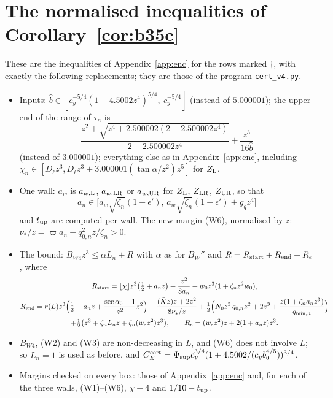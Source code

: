 \documentclass[11pt]{amsart}
\newcommand{\ta}{\tan\alpha}
\newcommand{\sez}{\sec\alpha_0}
\newcommand{\Kb}{\bar K}
\theoremstyle{definition}
\theoremstyle{remark}
\numberwithin{equation}{section}
\begin{document}
\section{The normalised inequalities of Corollary~\ref{cor:b35c}}\label{app:encC}
These are the inequalities of Appendix~\ref{app:enc} for the rows marked $\dagger$, with exactly the following
replacements; they are those of the program \texttt{cert\_v4.py}.
\begin{itemize}
\item Inputs: $\hat b\in[c_y^{-5/4}(1-4.5002z^4)^{5/4},\ c_y^{-5/4}]$ (instead of $5.000001$); the upper end of the range of
$\tau_n$ is
\[
\frac{z^2+\sqrt{z^4+2.500002(2-2.500002z^4)}}{2-2.500002z^4}+\frac{z^3}{16\hat b}
\]
(instead of $3.000001$); everything
else as in Appendix~\ref{app:enc}, including $\chi_n\in[D_\ell z^3,D_\ell z^3+3.000001(\ta/z^2)z^5]$ for $Z_{\rm L}$.
\item One wall: $a_w$ is $a_{w,\rm L}$, $a_{w,\rm LR}$ or $a_{w,\rm UR}$ for $Z_{\rm L}$, $Z_{\rm LR}$, $Z_{\rm UR}$, so that
\[
a_n\in\bigl[a_w\sqrt{\zeta_n}(1-\epsilon'),\,a_w\sqrt{\zeta_n}(1+\epsilon')+g_qz^4\bigr]
\]
and $t_{\rm up}$ are computed per wall. The new
margin (W6), normalised by $z$: $\nu_*/z=\varpi a_n-q_{0,n}^2z/\zeta_n>0$.
\item The bound: $B_{W4}z^3\le\alpha L_n+R$ with $\alpha$ as for $B_W''$ and $R=R_{\rm start}+R_{\rm end}+R_e$, where
\begin{gather*}
R_{\rm start}=\lfloor\chi\rfloor z^3\bigl(\tfrac12+a_nz\bigr)+\frac{z^2}{8a_n}+w_0z^3(1+\zeta_nz^2w_0),\\
R_{\rm end}=r(L)z^3\Bigl(\tfrac12+a_nz+\frac{\sez-1}{z^2}z^2\Bigr)+\frac{(\Kb z)z+2z^2}{8\nu_*/z}
+\tfrac12\Bigl(N_0z^3\,q_{0,n}z^2+2z^3+\frac{z(1+\zeta_na_nz^3)}{q_{\min,n}}\Bigr)\\
+\tfrac12\bigl(z^3+\zeta_nL_nz+\zeta_n(w_ez^2)z^3\bigr),\qquad
R_e=(w_ez^2)z+2(1+a_nz)z^3 .
\end{gather*}
\item $B_{W4}$, (W2) and (W3) are non-decreasing in $L$, and (W6) does not involve $L$; so $L_n=1$ is used as before, and
$C_E^{\rm cert}=\Psi_{\sup}c_y^{3/4}(1+4.5002/(c_yb_0^{4/5}))^{3/4}$.
\item Margins checked on every box: those of Appendix~\ref{app:enc} and, for each of the three walls, (W1)--(W6),
$\chi-4$ and $1/10-t_{\rm up}$.
\end{itemize}
\end{document}
